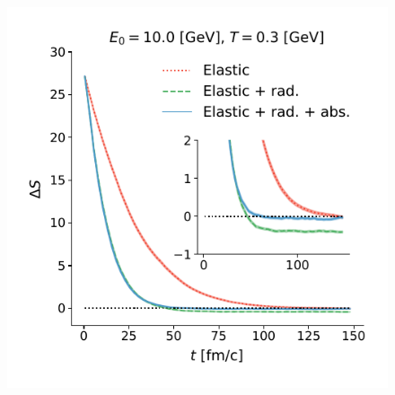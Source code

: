 \documentclass[aps, prc, reprint, amsmath, groupedaddress, nofootinbib]{revtex4-1}
\begin{document}
\begin{figure}
\includegraphics[width=\columnwidth]{charm-plot/thermalization.pdf}
\end{figure}
\end{document}
